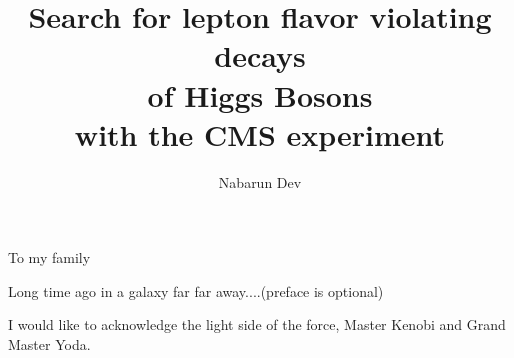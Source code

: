 \documentclass[final,numrefs,sort&compress]{nddiss2e}
\begin{document}
\title{Search for lepton flavor violating decays \protect\\ of Higgs Bosons \protect\\ with the CMS experiment}
\author{Nabarun Dev}

\maketitle
%
%

\makepublicdomain

\begin{abstract}
\end{abstract}

\renewcommand{\dedicationname}{Dedicated to}

\begin{dedication}
  To my family
\end{dedication}

\tableofcontents
\listoffigures
\listoftables

\begin{preface}
  Long time ago in a galaxy far far away....(preface is optional)
\end{preface}

\begin{acknowledge}
  I would like to acknowledge the light side of the force, Master Kenobi and Grand Master Yoda.
\end{acknowledge}

\begin{symbols}
\end{symbols}
\end{document}
